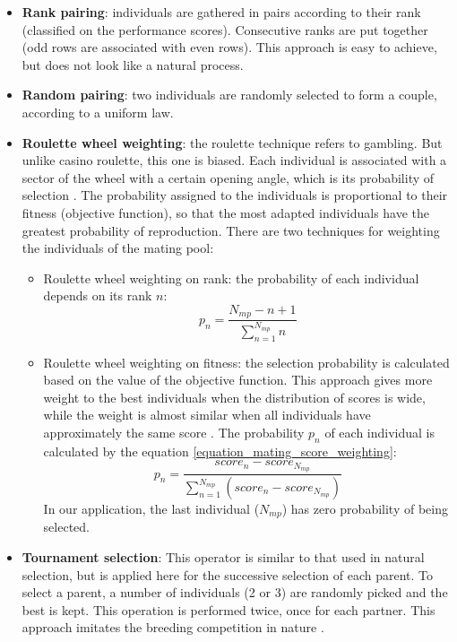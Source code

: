 \documentclass{ametsoc}
\begin{document}
\begin{itemize}
	\item \textbf{Rank pairing}: individuals are gathered in pairs according to their rank (classified on the performance scores). Consecutive ranks are put together (odd rows are associated with even rows). This approach is easy to achieve, but does not look like a natural process.
	
	\item \textbf{Random pairing}: two individuals are randomly selected to form a couple, according to a uniform law.
	
	\item \textbf{Roulette wheel weighting}: the roulette technique refers to gambling. But unlike casino roulette, this one is biased. Each individual is associated with a sector of the wheel with a certain opening angle, which is its probability of selection \citep{Haupt2004}. The probability assigned to the individuals is proportional to their fitness (objective function), so that the most adapted individuals have the greatest probability of reproduction. There are two techniques for weighting the individuals of the mating pool:
	\begin{itemize}
		\item Roulette wheel weighting on rank: the probability of each individual depends on its rank $n$:
		\begin{equation}
		p_{n}=\dfrac{N_{mp}-n+1}{\sum^{N_{mp}}_{n=1}n}
		\label{equation_mating_rank_weighting}
		\end{equation}
		
		\item Roulette wheel weighting on fitness: the selection probability is calculated based on the value of the objective function. This approach gives more weight to the best individuals when the distribution of scores is wide, while the weight is almost similar when all individuals have approximately the same score \citep{Haupt2004}. The probability $p_{n}$ of each individual is calculated by the equation \ref{equation_mating_score_weighting}:
		\begin{equation}
		p_{n}=\frac{score_{n}-score_{N_{mp}}}{\sum_{n=1}^{N_{mp}} (score_{n}-score_{N_{mp}})}
		\label{equation_mating_score_weighting}
		\end{equation}
		In our application, the last individual ($N_{mp}$) has zero probability of being selected.
	\end{itemize}
	
	\item \textbf{Tournament selection}: This operator is similar to that used in natural selection, but is applied here for the successive selection of each parent. To select a parent, a number of individuals (2 or 3) are randomly picked and the best is kept. This operation is performed twice, once for each partner. This approach imitates the breeding competition in nature \citep{Haupt2004}.
\end{itemize}
\end{document}
